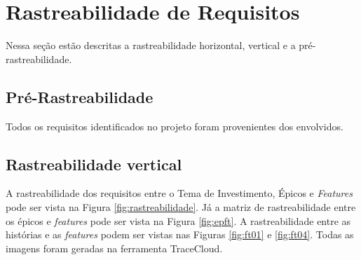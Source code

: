 \section[Rastreabilidade de Requisitos]{Rastreabilidade de Requisitos}

Nessa seção estão descritas a rastreabilidade horizontal, vertical e a pré-rastreabilidade.


\subsection{Pré-Rastreabilidade}

Todos os requisitos identificados no projeto foram provenientes dos envolvidos.

% 
% 
% 
% 
% 
% 

\subsection{Rastreabilidade vertical}
A rastreabilidade dos requisitos entre o Tema de Investimento, Épicos e \textit{Features} pode ser vista na Figura \ref{fig:rastreabilidade}.
Já a matriz de rastreabilidade entre os épicos e \textit{features} pode ser vista na Figura \ref{fig:epft}. A rastreabilidade
entre as histórias e as \textit{features} podem ser vistas nas Figuras \ref{fig:ft01} e \ref{fig:ft04}. Todas as imagens foram geradas
na ferramenta TraceCloud. \footnotemark

